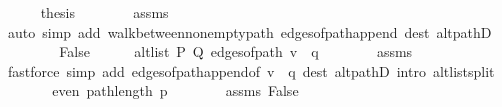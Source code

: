 \begin{isabellebody}
\ \ \ \ \isamarkupfalse%
\ {\isacharquery}{\kern0pt}thesis\isanewline
\ \ \ \ \ \ \isamarkupfalse%
\ assms{\isacharparenleft}{\kern0pt}{}{\isacharparenright}{\kern0pt}\isanewline
\ \ \ \ \ \ \isamarkupfalse%
\ {\isacharparenleft}{\kern0pt}auto\ simp\ add{\isacharcolon}{\kern0pt}\ walk{\isacharunderscore}{\kern0pt}between{\isacharunderscore}{\kern0pt}nonempty{\isacharunderscore}{\kern0pt}path{\isacharparenleft}{\kern0pt}{}{\isacharparenright}{\kern0pt}\ edges{\isacharunderscore}{\kern0pt}of{\isacharunderscore}{\kern0pt}path{\isacharunderscore}{\kern0pt}append{\isacharunderscore}{\kern0pt}{}\ dest{\isacharcolon}{\kern0pt}\ alt{\isacharunderscore}{\kern0pt}pathD{\isacharparenleft}{\kern0pt}{}{\isacharparenright}{\kern0pt}{\isacharparenright}{\kern0pt}\isanewline
\ \ \isamarkupfalse%
\isanewline
\ \ \ \ \isamarkupfalse%
\ False\isanewline
\ \ \ \ \isamarkupfalse%
\ {\isachardoublequoteopen}alt{\isacharunderscore}{\kern0pt}list\ P\ Q\ {\isacharparenleft}{\kern0pt}edges{\isacharunderscore}{\kern0pt}of{\isacharunderscore}{\kern0pt}path\ {\isacharparenleft}{\kern0pt}v\ {\isacharhash}{\kern0pt}\ q{\isacharparenright}{\kern0pt}{\isacharparenright}{\kern0pt}{\isachardoublequoteclose}\isanewline
\ \ \ \ \ \ \isamarkupfalse%
\ assms{\isacharparenleft}{\kern0pt}{}{\isacharparenright}{\kern0pt}\isanewline
\ \ \ \ \ \ \isamarkupfalse%
\ {\isacharparenleft}{\kern0pt}fastforce\ simp\ add{\isacharcolon}{\kern0pt}\ edges{\isacharunderscore}{\kern0pt}of{\isacharunderscore}{\kern0pt}path{\isacharunderscore}{\kern0pt}append{\isacharunderscore}{\kern0pt}{}{\isacharbrackleft}{\kern0pt}of\ {\isachardoublequoteopen}v\ {\isacharhash}{\kern0pt}\ q{\isachardoublequoteclose}{\isacharbrackright}{\kern0pt}\ dest{\isacharcolon}{\kern0pt}\ alt{\isacharunderscore}{\kern0pt}pathD{\isacharparenleft}{\kern0pt}{}{\isacharparenright}{\kern0pt}\ intro{\isacharcolon}{\kern0pt}\ alt{\isacharunderscore}{\kern0pt}list{\isacharunderscore}{\kern0pt}split{\isacharunderscore}{\kern0pt}{}{\isacharparenright}{\kern0pt}\isanewline
\ \ \ \ \isamarkupfalse%
\ \isamarkupfalse%
\ {\isachardoublequoteopen}even\ {\isacharparenleft}{\kern0pt}path{\isacharunderscore}{\kern0pt}length\ p{\isacharprime}{\kern0pt}{\isacharparenright}{\kern0pt}{\isachardoublequoteclose}\isanewline
\ \ \ \ \ \ \isamarkupfalse%
\ assms\ False\isanewline
\ \ \ \ \ \ \isamarkupfalse%

\end{isabellebody}
